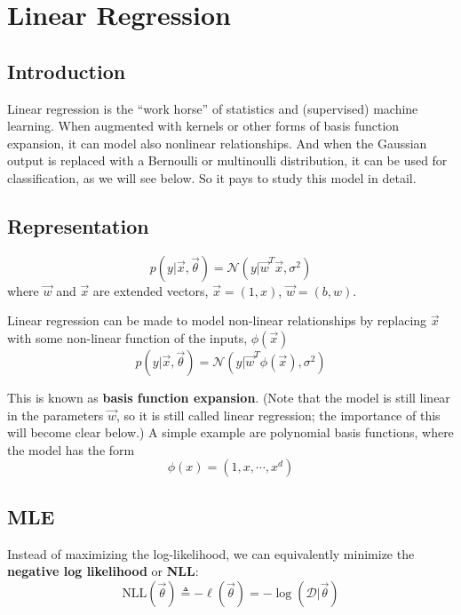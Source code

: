 \chapter{Linear Regression}


\section{Introduction}
Linear regression is the “work horse” of statistics and (supervised) machine learning. When augmented with kernels or other forms of basis function expansion, it can model also nonlinear relationships. And when the Gaussian output is replaced with a Bernoulli or multinoulli distribution, it can be used for classification, as we will see below. So it pays to study this model in detail.


\section{Representation}

\begin{equation}
p(y|\vec{x},\vec{\theta})=\mathcal{N}(y|\vec{w}^T\vec{x}, \sigma^2)
\end{equation}
where $\vec{w}$ and $\vec{x}$ are extended vectors, $\vec{x}=(1,x)$, $\vec{w}=(b,w)$.

Linear regression can be made to model non-linear relationships by replacing $\vec{x}$ with some non-linear function of the inputs, $\phi(\vec{x})$ \begin{equation}
p(y|\vec{x},\vec{\theta})=\mathcal{N}(y|\vec{w}^T\phi(\vec{x}), \sigma^2)
\end{equation}

This is known as \textbf{basis function expansion}. (Note that the model is still linear in the parameters $\vec{w}$, so it is still called linear regression; the importance of this will become clear below.) A simple example are polynomial basis functions, where the model has the form
\begin{equation}
\phi(x)=(1, x, \cdots, x^d)
\end{equation}



\section{MLE}
Instead of maximizing the log-likelihood, we can equivalently minimize the \textbf{negative log likelihood} or \textbf{NLL}:
\begin{equation}
\text{NLL}(\vec{\theta}) \triangleq -\ell(\vec{\theta})=-\log(\mathcal{D}|\vec{\theta})
\end{equation}

